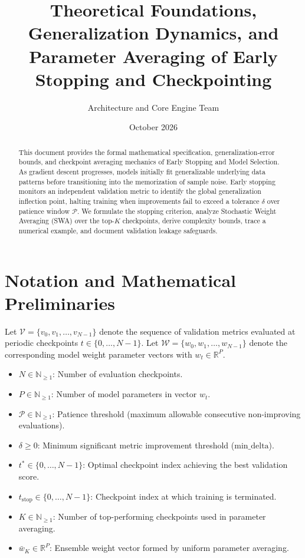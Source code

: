 \documentclass[11pt,a4paper]{article}
\title{\textbf{Theoretical Foundations, Generalization Dynamics, and Parameter Averaging of Early Stopping and Checkpointing}}
\author{Architecture and Core Engine Team}
\date{October 2026}
\theoremstyle{definition}
\begin{document}
\maketitle

\begin{abstract}
This document provides the formal mathematical specification, generalization-error bounds, and checkpoint averaging mechanics of Early Stopping and Model Selection. As gradient descent progresses, models initially fit generalizable underlying data patterns before transitioning into the memorization of sample noise. Early stopping monitors an independent validation metric to identify the global generalization inflection point, halting training when improvements fail to exceed a tolerance $\delta$ over patience window $\mathcal{P}$. We formulate the stopping criterion, analyze Stochastic Weight Averaging (SWA) over the top-$K$ checkpoints, derive complexity bounds, trace a numerical example, and document validation leakage safeguards.
\end{abstract}

\section{Notation and Mathematical Preliminaries}

Let $\mathcal{V} = \{v_0, v_1, \dots, v_{N-1}\}$ denote the sequence of validation metrics evaluated at periodic checkpoints $t \in \{0, \dots, N-1\}$. Let $\mathcal{W} = \{w_0, w_1, \dots, w_{N-1}\}$ denote the corresponding model weight parameter vectors with $w_t \in \mathbb{R}^P$.

\begin{itemize}
    \item $N \in \mathbb{N}_{\ge 1}$: Number of evaluation checkpoints.
    \item $P \in \mathbb{N}_{\ge 1}$: Number of model parameters in vector $w_t$.
    \item $\mathcal{P} \in \mathbb{N}_{\ge 1}$: Patience threshold (maximum allowable consecutive non-improving evaluations).
    \item $\delta \ge 0$: Minimum significant metric improvement threshold ($\text{min\_delta}$).
    \item $t^* \in \{0, \dots, N-1\}$: Optimal checkpoint index achieving the best validation score.
    \item $t_{\text{stop}} \in \{0, \dots, N-1\}$: Checkpoint index at which training is terminated.
    \item $K \in \mathbb{N}_{\ge 1}$: Number of top-performing checkpoints used in parameter averaging.
    \item $\bar{w}_K \in \mathbb{R}^P$: Ensemble weight vector formed by uniform parameter averaging.
\end{itemize}
\end{document}
